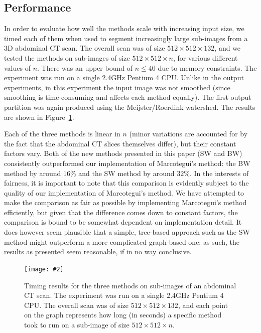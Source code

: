 \documentclass[preprint,a4paper]{elsarticle}
\newcommand{\stufigex}[5]					%
{
	\begin{figure}[#5]
	\begin{center}
		\texttt{[image: \#2]}
		\caption{#3}
		\label{#4}
	\end{center}
	\end{figure}
}
\begin{document}
\subsection{Performance}
\label{subsec:experiments-performance}

In order to evaluate how well the methods scale with increasing input size, we timed each of them when used to segment increasingly large sub-images from a 3D abdominal CT scan\footnotemark{}. The overall scan was of size $512 \times 512 \times 132$, and we tested the methods on sub-images of size $512 \times 512 \times n$, for various different values of $n$. There was an upper bound of $n \le 40$ due to memory constraints. The experiment was run on a single 2.4GHz Pentium 4 CPU. Unlike in the output experiments, in this experiment the input image was not smoothed (since smoothing is time-consuming and affects each method equally). The first output partition was again produced using the Meijster/Roerdink watershed. The results are shown in Figure~\ref{fig:timings}.


Each of the three methods is linear in $n$ (minor variations are accounted for by the fact that the abdominal CT slices themselves differ), but their constant factors vary. Both of the new methods presented in this paper (SW and BW) consistently outperformed our implementation of Marcotegui's method: the BW method by around $16$\% and the SW method by around $32$\%. In the interests of fairness, it is important to note that this comparison is evidently subject to the quality of our implementation of Marcotegui's method. We have attempted to make the comparison as fair as possible by implementing Marcotegui's method efficiently, but given that the difference comes down to constant factors, the comparison is bound to be somewhat dependent on implementation detail. It does however seem plausible that a simple, tree-based approach such as the SW method might outperform a more complicated graph-based one; as such, the results as presented seem reasonable, if in no way conclusive.

\stufigex{width=.95\linewidth}{timings.png}{Timing results for the three methods on sub-images of an abdominal CT scan. The experiment was run on a single 2.4GHz Pentium 4 CPU. The overall scan was of size $512 \times 512 \times 132$, and each point on the graph represents how long (in seconds) a specific method took to run on a sub-image of size $512 \times 512 \times n$.}{fig:timings}{!t}
\end{document}
